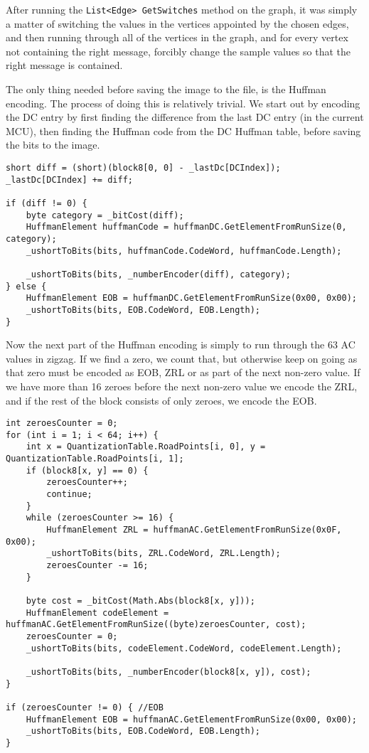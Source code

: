 After running the \lstinline|List<Edge> GetSwitches| method on the graph, it was simply a matter of switching the values in the vertices appointed by the chosen edges, and then running through all of the vertices in the graph, and for every vertex not containing the right message, forcibly change the sample values so that the right message is contained.


The only thing needed before saving the image to the file, is the Huffman encoding.
The process of doing this is relatively trivial.
We start out by encoding the DC entry by first finding the difference from the last DC entry (in the current MCU), then finding the Huffman code from the DC Huffman table, before saving the bits to the image.

\begin{lstlisting}
short diff = (short)(block8[0, 0] - _lastDc[DCIndex]);
_lastDc[DCIndex] += diff;

if (diff != 0) {
    byte category = _bitCost(diff);
    HuffmanElement huffmanCode = huffmanDC.GetElementFromRunSize(0, category);
    _ushortToBits(bits, huffmanCode.CodeWord, huffmanCode.Length);

    _ushortToBits(bits, _numberEncoder(diff), category);
} else {
    HuffmanElement EOB = huffmanDC.GetElementFromRunSize(0x00, 0x00);
    _ushortToBits(bits, EOB.CodeWord, EOB.Length);
}
\end{lstlisting}

Now the next part of the Huffman encoding is simply to run through the 63 AC values in zigzag.
If we find a zero, we count that, but otherwise keep on going as that zero must be encoded as EOB, ZRL or as part of the next non-zero value.
If we have more than 16 zeroes before the next non-zero value we encode the ZRL, and if the rest of the block consists of only zeroes, we encode the EOB.

\begin{lstlisting}
int zeroesCounter = 0;
for (int i = 1; i < 64; i++) {
    int x = QuantizationTable.RoadPoints[i, 0], y = QuantizationTable.RoadPoints[i, 1];
    if (block8[x, y] == 0) {
        zeroesCounter++;
        continue;
    }
    while (zeroesCounter >= 16) {
        HuffmanElement ZRL = huffmanAC.GetElementFromRunSize(0x0F, 0x00);
        _ushortToBits(bits, ZRL.CodeWord, ZRL.Length);
        zeroesCounter -= 16;
    }

    byte cost = _bitCost(Math.Abs(block8[x, y]));
    HuffmanElement codeElement = huffmanAC.GetElementFromRunSize((byte)zeroesCounter, cost);
    zeroesCounter = 0;
    _ushortToBits(bits, codeElement.CodeWord, codeElement.Length);

    _ushortToBits(bits, _numberEncoder(block8[x, y]), cost);
}

if (zeroesCounter != 0) { //EOB
    HuffmanElement EOB = huffmanAC.GetElementFromRunSize(0x00, 0x00);
    _ushortToBits(bits, EOB.CodeWord, EOB.Length);
}
\end{lstlisting}

